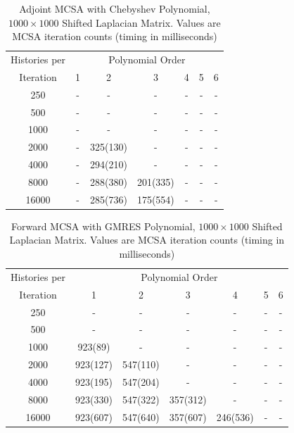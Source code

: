 \documentclass[10pt]{article}
\begin{document}
\begin{table}
\caption{Adjoint MCSA with Chebyshev Polynomial, $1000 \times 1000$ Shifted Laplacian Matrix.
Values are MCSA iteration counts (timing in milliseconds)
\label{tab:lap_adjoint_cheby}}
\centering
\begin{tabular}{ccccccc}
\toprule
Histories per & \multicolumn{6}{c}{Polynomial Order} \\
Iteration & 1 & 2 & 3 & 4 & 5 & 6 \\
\midrule
250 & - & - & - & - & - & - \\
500 & - & - & - & - & - & - \\
1000 & - & - & - & - & - & - \\
2000 & - & 325(130) & - & - & - & - \\
4000 & - & 294(210) & - & - & - & - \\
8000 & - & 288(380) & 201(335) & - & - & - \\
16000 & - & 285(736) & 175(554) & - & - & - \\
\bottomrule
\end{tabular}
\end{table}

\begin{table}
\caption{Forward MCSA with GMRES Polynomial, $1000 \times 1000$ Shifted Laplacian Matrix.
Values are MCSA iteration counts (timing in milliseconds)
\label{tab:lap_forward_gmres}}
\centering
\begin{tabular}{ccccccc}
\toprule
Histories per & \multicolumn{6}{c}{Polynomial Order} \\
Iteration & 1 & 2 & 3 & 4 & 5 & 6 \\
\midrule
250 & - & - & - & - & - & - \\
500 & - & - & - & - & - & - \\
1000 & 923(89) & - & - & - & - & - \\
2000 & 923(127) & 547(110) & - & - & - & - \\
4000 & 923(195) & 547(204) & - & - & - & - \\
8000 & 923(330) & 547(322) & 357(312) & - & - & - \\
16000 & 923(607) & 547(640) & 357(607) & 246(536) & - & - \\
\bottomrule
\end{tabular}
\end{table}
\end{document}
